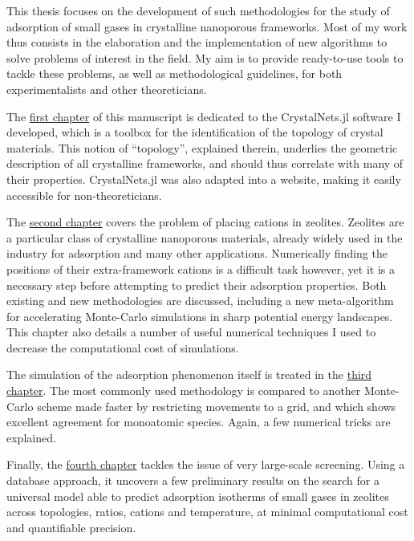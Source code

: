 \vspace{2em}

This thesis focuses on the development of such methodologies for the study of adsorption of small gases in crystalline nanoporous frameworks. Most of my work thus consists in the elaboration and the implementation of new algorithms to solve problems of interest in the field. My aim is to provide ready-to-use tools to tackle these problems, as well as methodological guidelines, for both experimentalists and other theoreticians.

The \hyperref[topology]{first chapter} of this manuscript is dedicated to the CrystalNets.jl software I developed, which is a toolbox for the identification of the topology of crystal materials. This notion of ``topology'', explained therein, underlies the geometric description of all crystalline frameworks, and should thus correlate with many of their properties. CrystalNets.jl was also adapted into a website, making it easily accessible for non-theoreticians.

The \hyperref[cationzeolites]{second chapter} covers the problem of placing cations in zeolites. Zeolites are a particular class of crystalline nanoporous materials, already widely used in the industry for adsorption and many other applications. Numerically finding the positions of their extra-framework cations is a difficult task however, yet it is a necessary step before attempting to predict their adsorption properties. Both existing and new methodologies are discussed, including a new meta-algorithm for accelerating Monte-Carlo simulations in sharp potential energy landscapes. This chapter also details a number of useful numerical techniques I used to decrease the computational cost of simulations.

The simulation of the adsorption phenomenon itself is treated in the \hyperref[adsorption]{third chapter}. The most commonly used methodology is compared to another Monte-Carlo scheme made faster by restricting movements to a grid, and which shows excellent agreement for monoatomic species. Again, a few numerical tricks are explained.

Finally, the \hyperref[database]{fourth chapter} tackles the issue of very large-scale screening. Using a database approach, it uncovers a few preliminary results on the search for a universal model able to predict adsorption isotherms of small gases in zeolites across topologies, \SiAl ratios, cations and temperature, at minimal computational cost and quantifiable precision.


\vfill
\begin{center}
\end{center}
\vfill\vfill
